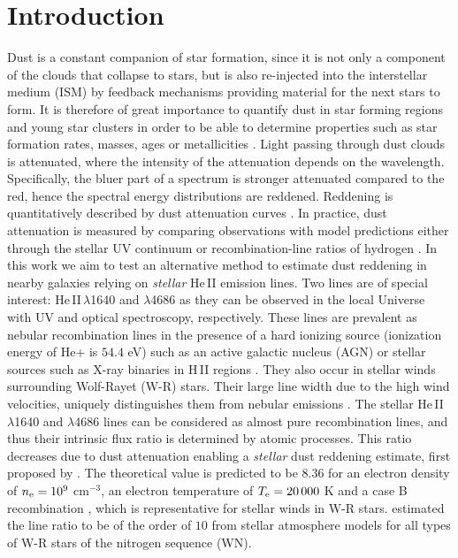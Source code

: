 \documentclass[linenumbers]{aastex63}
\begin{document}
\section{Introduction}\label{sec:intro}
Dust is a constant companion of star formation, since it is not only a component of the clouds that collapse to stars, but is also re-injected into the interstellar medium (ISM) by feedback mechanisms providing material for the next stars to form. It is therefore of great importance to quantify dust in star forming regions and young star clusters in order to be able to determine properties such as star formation rates, masses, ages or metallicities \citep{calzetti_dust_2009}.
Light passing through dust clouds is attenuated, where the intensity of the attenuation depends on the wavelength. Specifically, the bluer part of a spectrum is stronger attenuated compared to the red, hence the spectral energy distributions are reddened. Reddening is quantitatively described by dust attenuation curves \citep[][]{fitzpatrick_average_1986, calzetti_dust_1994, salim_dust_2018}. 
In practice, dust attenuation is measured by comparing observations with model predictions either through the stellar UV continuum \citep[e.g.][]{calzetti_dust_1994} or recombination-line ratios of hydrogen \citep[e.g.][]{dominguez_dust_2013}. 
In this work we aim to test an alternative method to estimate dust reddening in nearby galaxies relying on \textit{stellar} He\,II emission lines.
Two lines are of special interest: He\,II\,$\lambda$1640 and $\lambda$4686 as they can be observed in the local Universe with UV and optical spectroscopy, respectively. These lines are prevalent as nebular recombination lines in the presence of a hard ionizing source (ionization energy of He+ is $54.4$ eV) such as an active galactic nucleus (AGN) or stellar sources such as X-ray binaries in H\,II regions \citep{shirazi_strongly_2012}. They also occur in stellar winds surrounding Wolf-Rayet (W-R) stars. Their large line width due to the high wind velocities, uniquely distinguishes them from nebular emissions \citep{schaerer_about_1996}. 
The stellar He\,II\,$\lambda$1640 and $\lambda$4686 lines can be considered as almost pure recombination lines, and thus their intrinsic flux ratio is determined by atomic processes. This ratio decreases due to dust attenuation enabling a {\it stellar} dust reddening estimate, first proposed by \citet{conti_new_1990}. The theoretical value is predicted to be $8.36$ for an electron density of $n\rm _e = 10^9$ cm$^{-3}$, an electron temperature of $T\rm_e=20\,000$ K and a case B recombination \citep{hummer_recombination-line_1987}, which is representative for stellar winds in W-R stars. \citet{crowther_reduced_2006} estimated the line ratio to be of the order of $10$ from stellar atmosphere models for all types of W-R stars of the nitrogen sequence (WN).
\end{document}
